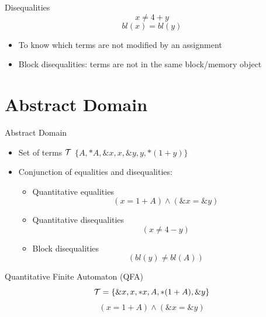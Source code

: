 \documentclass{beamer}
\begin{document}
\begin{frame}{Disequalities}
    \[
        x \neq 4 + y
    \]
    \[
        bl(x) = bl(y)
    \]
    \begin{itemize}
        \item To know which terms are not modified by an assignment
        \item Block disequalities: terms are not in the same block/memory object
    \end{itemize}
\end{frame}

\section{Abstract Domain}
\frame{\tableofcontents[currentsection]}

\begin{frame}{Abstract Domain}
    \begin{itemize}
        \item Set of terms $\mathcal{T}$
              $\{A, *A, \&x, x, \&y, y, *(1+y)\}$
        \item Conjunction of equalities and disequalities:
              \begin{itemize}
                  \item Quantitative equalities
                        \[
                            (x = 1 + A) \land (\&x = \&y)
                        \]
                  \item Quantitative disequalities
                        \[
                            (x \neq 4 - y)
                        \]
                  \item Block disequalities
                        \[
                            (bl(y) \neq bl(A))
                        \]
              \end{itemize}
    \end{itemize}
\end{frame}

\begin{frame}{Quantitative Finite Automaton (QFA)}
    \[
        \mathcal{T}=\{ \&x, x, *x, A, *(1 + A), \&y\}
    \]
    \[
        (x = 1 + A) \land (\&x = \&y)
    \]
    \centering
\end{frame}
\end{document}
